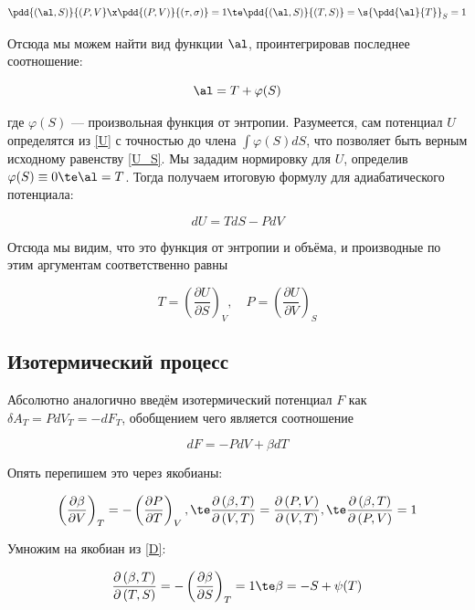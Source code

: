 \documentclass[12pt]{kiarticle}
\newcommand{\del}{\ensuremath{\delta}}
\newcommand{\spdd}[2]{\left( \frac{\partial #1}{\partial #2} \right)}
\newcommand{\Dd}[4]{\frac{\partial \left( #1, #2\right) }{\partial \left( #3, #4\right)}}
\begin{document}
\begin{equation}\label{}
\pdd{(\al, S)}{(P, V} \x  \pdd{(P, V)}{(\tau, \sigma)} = 1 \te \pdd{(\al, S)}{(T, S)} = \s{\pdd{\al}{T}}_S = 1
\end{equation}

Отсюда мы можем найти вид функции $ \al $, проинтегрировав последнее соотношение:

\begin{equation}\label{}
\al = T + \varphi(S)
\end{equation}

где $ \varphi(S) $ --- произвольная функция от энтропии. Разумеется, сам потенциал $ U $ определятся из \eqref{U} с точностью до члена $ \int \varphi(S)dS $, что позволяет быть верным исходному равенству \eqref{U_S}. Мы зададим нормировку для $ U $, определив $ \varphi(S) \equiv 0 \te \al = T $. Тогда получаем итоговую формулу для адиабатического потенциала:

\begin{equation}\label{U =}
dU = TdS - PdV
\end{equation}

Отсюда мы видим, что это функция от энтропии и объёма, и производные по этим аргументам соответственно равны 

\begin{equation}\label{}
T = \spdd{U}{S}_V, \quad P = \spdd{U}{V}_S
\end{equation}

\subsection{Изотермический процесс}

Абсолютно аналогично введём изотермический потенциал $ F $ как $ \del A_T = P dV_T = - dF_T $, обобщением чего является соотношение

\begin{equation}\label{F}
dF = -PdV + \beta dT
\end{equation}

Опять перепишем это через якобианы: 

\begin{equation}\label{}
\spdd{\beta}{V}_T = - \spdd{P}{T}_V , \te \Dd{\beta}{T}{V}{T} = \Dd{P}{V}{V}{T} ,  \te \Dd{\beta}{T}{P}{V} = 1
\end{equation}

Умножим на якобиан из \eqref{D}:

\begin{equation}\label{}
\Dd{\beta}{T}{T}{S} = -\spdd{\beta}{S}_T = 1 \te \beta = -S + \psi(T)
\end{equation}
\end{document}
